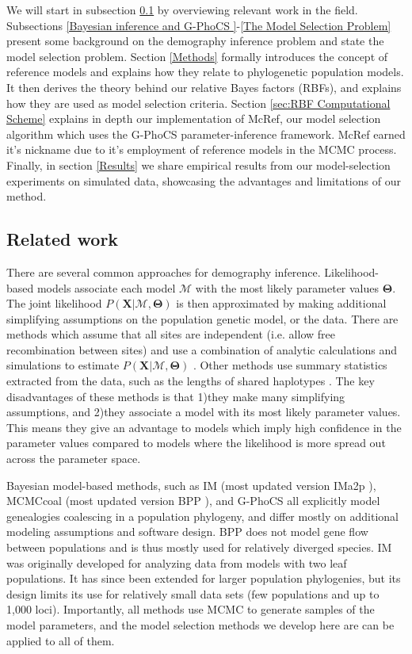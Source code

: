 \documentclass[11pt]{article}
\newcommand{\vect}[1]{\boldsymbol{\mathbf{#1}}}
\newcommand{\X}{\vect{X}}
\newcommand{\M}{\mathcal{M}}
\newcommand{\T}{\vect{\Theta}}
\newcommand{\1}{\mathbbm{1}}
\newcommand{\gp}{G-PhoCS }
\begin{document}
We will start in subsection \ref{Related work} by overviewing relevant work in the field.
%
Subsections \ref{Bayesian inference and \gp}-\ref{The Model Selection Problem} present some background on the demography inference problem and state the model selection problem.
%
Section \ref{Methods} formally introduces the concept of reference models and explains how they relate to phylogenetic population models. It then derives the theory behind our relative Bayes factors (RBFs), and explains how they are used as model selection criteria. 
%
Section \ref{sec:RBF Computational Scheme} explains in depth our implementation of McRef, our model selection algorithm which uses the \gp parameter-inference framework. McRef earned it's nickname due to it's employment of reference models in the MCMC process.
%
Finally, in section \ref{Results} we share empirical results from our model-selection experiments on simulated data, showcasing the advantages and limitations of our method.


\subsection{Related work} \label{Related work}

There are several common approaches for demography inference. 
%
Likelihood-based models associate each model $\M$ with the most likely parameter values $\T$.
%
The joint likelihood $P(\X|\M,\T)$ is then approximated by making additional simplifying assumptions on the population genetic model, or the data.
%
There are methods which assume that all sites are independent (i.e. allow free recombination between sites) and use a combination of analytic calculations and simulations to estimate $P(\X|\M,\T)$ \citep{GUTEETAL09,KAMMETAL17,KAMMETAL18}. 
%
Other methods use summary statistics extracted from the data, such as the lengths of shared haplotypes \citep{HARRNIEL13,BROWBROW15}. 
%
The key disadvantages of these methods is that 1)they make many simplifying assumptions, and 2)they associate a model with its most likely parameter values. 
%
This means they give an advantage to models which imply high confidence in the parameter values compared to models where the likelihood is more spread out across the parameter space.

Bayesian model-based methods, such as IM \citep{NIELWAKE01} (most updated version IMa2p \citep{HEYNIEL07,SETHHEY16}), MCMCcoal \cite{RANNYANG03} (most updated version BPP \citep{YANG15}), and \gp \citep{GRONETAL11} all explicitly model genealogies coalescing in a population phylogeny, and differ mostly on additional modeling assumptions and software design.
%
BPP does not model gene flow between populations and is thus mostly used for relatively diverged species. 
%
IM was originally developed for analyzing data from models with two leaf populations. 
%
It has since been extended for larger population phylogenies, but its design limits its use for relatively small data sets (few populations and up to 1,000 loci). 
%
Importantly, all methods use MCMC to generate samples of the model parameters, and the model selection methods we develop here are can be applied to all of them.
\end{document}
